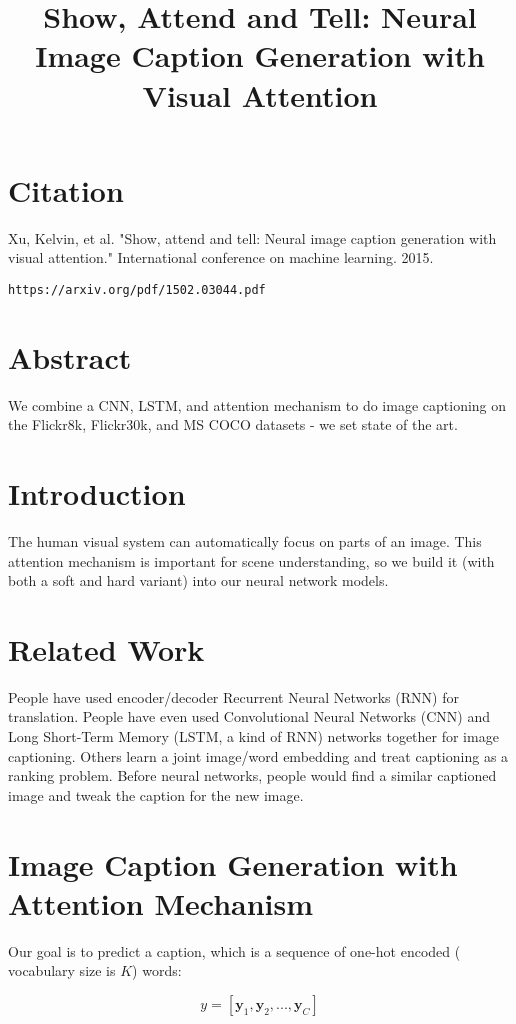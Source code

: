 \documentclass[a4paper]{article}
\title{Show, Attend and Tell: Neural Image Caption
Generation with Visual Attention}
\date{}
\begin{document}
\maketitle

\section{Citation}
Xu, Kelvin, et al. "Show, attend and tell: Neural image caption generation with visual attention." International conference on machine learning. 2015.

\begin{verbatim}
https://arxiv.org/pdf/1502.03044.pdf
\end{verbatim}

\section{Abstract}
We combine a CNN, LSTM, and attention mechanism to do image captioning on
the Flickr8k, Flickr30k, and MS COCO datasets - we set state of the art.

\section{Introduction}
The human visual system can automatically focus on parts of an image. This
attention mechanism is important for scene understanding, so we build it (with
both a soft and hard variant) into our neural network models.

\section{Related Work}
People have used encoder/decoder Recurrent Neural Networks (RNN) for
translation. People have even used Convolutional Neural Networks (CNN) and
Long Short-Term Memory (LSTM, a kind of RNN) networks together for image
captioning. Others learn a joint image/word embedding and treat captioning as
a ranking problem. Before neural networks, people would find a similar captioned
image and tweak the caption for the new image.

\section{Image Caption Generation with Attention Mechanism}
Our goal is to predict a caption, which is a sequence of one-hot encoded (
vocabulary size is $K$) words:

$$
y = [\mathbf{y}_1, \mathbf{y}_2, ..., \mathbf{y}_C]
$$
\end{document}
